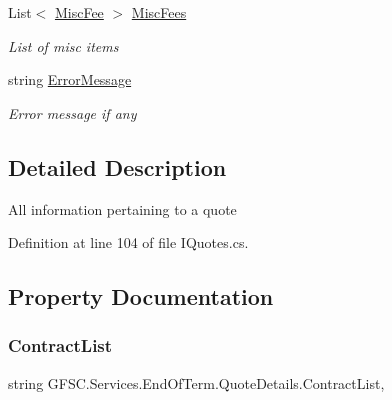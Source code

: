 \begin{DoxyCompactItemize}
List$<$ \mbox{\hyperlink{class_g_f_s_c_1_1_services_1_1_end_of_term_1_1_misc_fee}{Misc\+Fee}} $>$ \mbox{\hyperlink{class_g_f_s_c_1_1_services_1_1_end_of_term_1_1_quote_details_a389e0852950c96d5d02e95cb6bf81c82}{Misc\+Fees}}
\begin{DoxyCompactList}\small\item\em List of misc items \end{DoxyCompactList}\item 
string \mbox{\hyperlink{class_g_f_s_c_1_1_services_1_1_end_of_term_1_1_quote_details_a4d12b61b84eaddfb9b30e75ebe4ba4f9}{Error\+Message}}
\begin{DoxyCompactList}\small\item\em Error message if any \end{DoxyCompactList}\end{DoxyCompactItemize}


\subsection{Detailed Description}
All information pertaining to a quote 



Definition at line 104 of file I\+Quotes.\+cs.



\subsection{Property Documentation}
\mbox{\label{class_g_f_s_c_1_1_services_1_1_end_of_term_1_1_quote_details_a12391fe474b254b47c39200d5c948612}} 
\subsubsection{\texorpdfstring{Contract\+List}{ContractList}}
{\footnotesize\ttfamily string G\+F\+S\+C.\+Services.\+End\+Of\+Term.\+Quote\+Details.\+Contract\+List\hspace{0.3cm}{\ttfamily [get]}, {\ttfamily [set]}}



